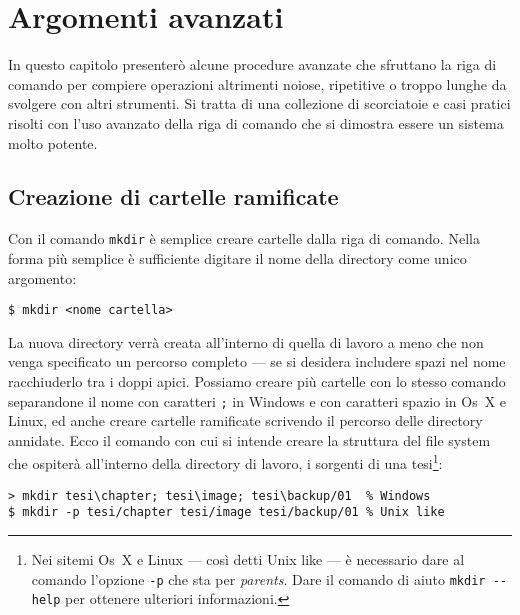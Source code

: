 
\chapter{Argomenti avanzati}
\label{chapAvanz}

In questo capitolo presenterò alcune procedure avanzate che sfruttano la riga di
comando per compiere operazioni altrimenti noiose, ripetitive o troppo lunghe da
svolgere con altri strumenti. Si tratta di una collezione di scorciatoie e casi
pratici risolti con l'uso avanzato della riga di comando che si dimostra essere
un sistema molto potente.


\section{Creazione di cartelle ramificate}
\label{secMkdir}
 
Con il comando \texttt{mkdir} è semplice creare cartelle dalla riga di
comando. Nella forma più semplice è sufficiente digitare il nome della directory
come unico argomento:
\begin{verbatim}
$ mkdir <nome cartella>
\end{verbatim}
La nuova directory verrà creata all'interno di quella di lavoro a meno che non
venga specificato un percorso completo --- se si desidera includere spazi nel
nome racchiuderlo tra i doppi apici. Possiamo creare più cartelle con lo stesso
comando separandone il nome con caratteri \texttt{;} in Windows e con caratteri
spazio in Os~X e Linux, ed anche creare cartelle ramificate scrivendo il
percorso delle directory annidate. Ecco il comando con cui si intende creare la
struttura del file system che ospiterà all'interno della directory di lavoro, i
sorgenti di una tesi\footnote{Nei sitemi Os~X e Linux --- così detti Unix like
  --- è necessario dare al comando l'opzione \texttt{-p} che sta per
  \emph{parents}. Dare il comando di aiuto \texttt{mkdir {-}-help} per ottenere 
  ulteriori informazioni.}:
\begin{verbatim}
> mkdir tesi\chapter; tesi\image; tesi\backup/01  % Windows
$ mkdir -p tesi/chapter tesi/image tesi/backup/01 % Unix like
\end{verbatim}

